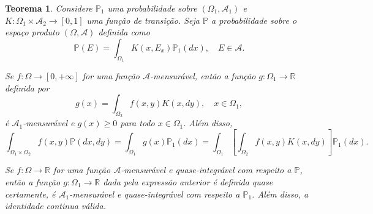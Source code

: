 \documentclass[12pt,a4paper,answers]{article}
\numberwithin{equation}{section} %
\theoremstyle{thm_estilo}
\newtheorem{theorem}{Teorema}[section]
\theoremstyle{thm_note_est}
\begin{document}
\begin{theorem}
	Considere $\mathbb{P}_1$ uma probabilidade sobre $(\Omega_1, \mathcal{A}_1)$ e $K : \Omega_1 \times \mathcal{A}_2 \rightarrow [0, 1]$ uma função de transição. Seja $\mathbb{P}$ a probabilidade sobre o espaço produto $(\Omega, \mathcal{A})$ definida como
	\begin{equation}
		\mathbb{P}(E) = \int_{\Omega_1} K(x, E_x)\mathbb{P}_1(dx), \quad E \in \mathcal{A}.
	\end{equation}
	
	\begin{outline}
		\1[(a)] Se $f : \Omega \rightarrow [0, +\infty]$ for uma função $\mathcal{A}$-mensurável, então a função $g : \Omega_1 \rightarrow \mathbb{R}$ definida por
		\begin{equation}
			g(x) = \int_{\Omega_2} f(x, y)K(x, dy), \quad x \in \Omega_1,
		\end{equation}
		é $\mathcal{A}_1$-mensurável e $g(x) \geq 0$ para todo $x \in \Omega_1$. Além disso,
		\begin{equation}
			\int_{\Omega_1 \times \Omega_2} f(x, y) \mathbb{P}(dx, dy) = \int_{\Omega_1} g(x) \mathbb{P}_1(dx) = \int_{\Omega_1} \left[\int_{\Omega_2} f(x, y)K(x, dy)\right] \mathbb{P}_1(dx).
		\end{equation}
		
		\1[(b)] Se $f : \Omega \rightarrow \mathbb{R}$ for uma função $\mathcal{A}$-mensurável e quase-integrável com respeito a $\mathbb{P}$, então a função $g : \Omega_1 \rightarrow \mathbb{R}$ dada pela expressão anterior é definida quase certamente, é $\mathcal{A}_1$-mensurável e quase-integrável com respeito a $\mathbb{P}_1$. Além disso, a identidade continua válida.
	\end{outline}
\end{theorem}
\end{document}
